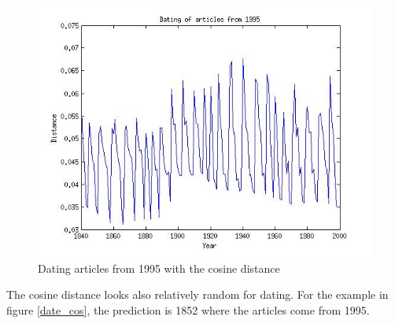 \begin{figure}[H]
\begin{minipage}[b]{0.3\linewidth}
	\includegraphics[scale=0.25]{Pictures/date_articles/cos/dating1995_corrected.jpg}
        \caption{Dating articles from 1995 with the cosine distance}
    \end{minipage}
    \label{date_d1}
\end{figure}
The cosine distance looks also relatively random for dating. For the example in figure \ref{date_cos}, the prediction is 1852 where the articles come from 1995.